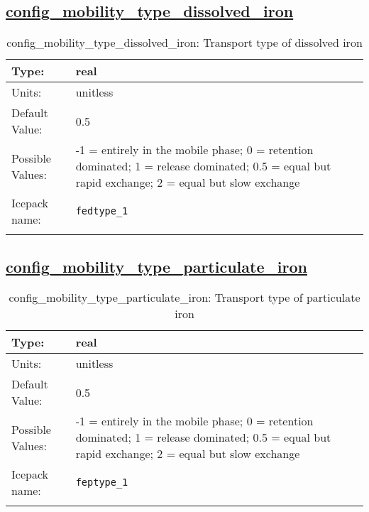 \subsection[config\_mobility\_type\_dissolved\_iron]{\hyperref[sec:nm_tab_biogeochemistry]{config\_mobility\_type\_dissolved\_iron}}
\label{subsec:nm_sec_config_mobility_type_dissolved_iron}
\begin{center}
\begin{longtable}{| p{2.0in} || p{4.0in} |}
    \hline
    Type: & real \\
    \hline
    Units: & \si{unitless} \\
    \hline
    Default Value: & 0.5 \\
    \hline
    Possible Values: & -1 = entirely in the mobile phase; 0 = retention dominated; 1 = release dominated; 0.5 = equal but rapid exchange; 2 = equal but slow exchange \\
    \hline
    Icepack name: & \verb+fedtype_1+ \\
    \hline
    \caption{config\_mobility\_type\_dissolved\_iron: Transport type of dissolved iron}
\end{longtable}
\end{center}
\subsection[config\_mobility\_type\_particulate\_iron]{\hyperref[sec:nm_tab_biogeochemistry]{config\_mobility\_type\_particulate\_iron}}
\label{subsec:nm_sec_config_mobility_type_particulate_iron}
\begin{center}
\begin{longtable}{| p{2.0in} || p{4.0in} |}
    \hline
    Type: & real \\
    \hline
    Units: & \si{unitless} \\
    \hline
    Default Value: & 0.5 \\
    \hline
    Possible Values: & -1 = entirely in the mobile phase; 0 = retention dominated; 1 = release dominated; 0.5 = equal but rapid exchange; 2 = equal but slow exchange \\
    \hline
    Icepack name: & \verb+feptype_1+ \\
    \hline
    \caption{config\_mobility\_type\_particulate\_iron: Transport type of particulate iron}
\end{longtable}
\end{center}

